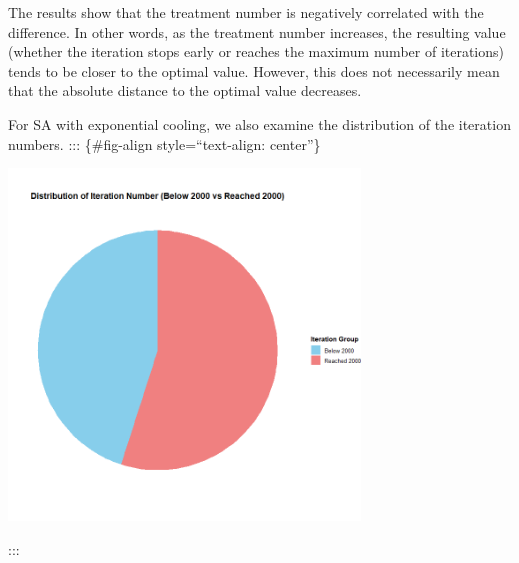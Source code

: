 \documentclass[
  a4paper,
  oneside,
  openany,
  12pt,
  onecolumn]{book}
\theoremstyle{plain}
\theoremstyle{definition}
\theoremstyle{remark}
\begin{document}
\begin{figure}


\caption{\label{fig-align}}

\end{figure}%

The results show that the treatment number is negatively correlated with
the difference. In other words, as the treatment number increases, the
resulting value (whether the iteration stops early or reaches the
maximum number of iterations) tends to be closer to the optimal value.
However, this does not necessarily mean that the absolute distance to
the optimal value decreases.

For SA with exponential cooling, we also examine the distribution of the
iteration numbers. ::: \{\#fig-align style=``text-align: center''\}
\begin{center}
\includegraphics[width=0.7\textwidth,height=\textheight]{../thesis/images/Rplots/SA-Fast-eva/SA-Fast-iternum-distribution.png}
\end{center}
:::
\end{document}
